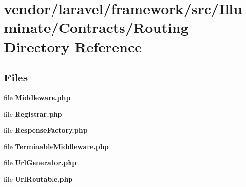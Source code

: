 \section{vendor/laravel/framework/src/\+Illuminate/\+Contracts/\+Routing Directory Reference}
\label{dir_d746b0981749537309d447337fe1b13b}
\subsection*{Files}
\begin{DoxyCompactItemize}
\item 
file {\bf Middleware.\+php}
\item 
file {\bf Registrar.\+php}
\item 
file {\bf Response\+Factory.\+php}
\item 
file {\bf Terminable\+Middleware.\+php}
\item 
file {\bf Url\+Generator.\+php}
\item 
file {\bf Url\+Routable.\+php}
\end{DoxyCompactItemize}
